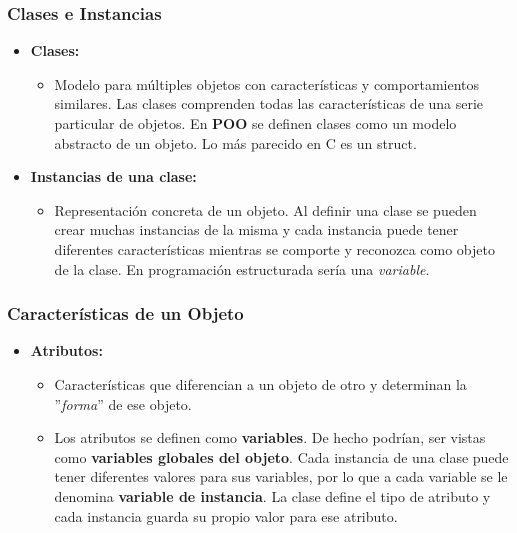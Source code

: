 \documentclass{beamer}
\begin{document}
\begin{frame}
  \frametitle{Clases e Instancias}

  \begin{itemize}
  \item \textbf{Clases:}    
    \begin{itemize}
    \item[] Modelo para múltiples objetos con características y
      comportamientos similares. Las clases comprenden todas las
      características de una serie particular de objetos. En
      \textbf{POO} se definen clases como un modelo abstracto de un
      objeto. Lo más parecido en C es un struct.
    \end{itemize}
    
  \item \textbf{Instancias de una clase:}
    \begin{itemize}
    \item[] Representación concreta de un objeto. Al definir una clase
      se pueden crear muchas instancias de la misma y cada instancia
      puede tener diferentes características mientras se comporte y
      reconozca como objeto de la clase. En programación estructurada
      sería una \emph{variable}.
    \end{itemize}
    
  \end{itemize}
\end{frame}

\begin{frame}
  \frametitle{Características de un Objeto} 

  \begin{itemize}
  \item \textbf{Atributos:}
    \begin{itemize}
    \item[] Características que diferencian a un objeto de otro y
      determinan la ''\emph{forma}'' de ese objeto.
      
    \item[] Los atributos se definen como \textbf{variables}. De hecho
      podrían, ser vistas como \textbf{variables globales del
        objeto}. Cada instancia de una clase puede tener diferentes
      valores para sus variables, por lo que a cada variable se le
      denomina \textbf{variable de instancia}. La clase define el tipo
      de atributo y cada instancia guarda su propio valor para ese
      atributo.
    \end{itemize}
  \end{itemize}
\end{frame}
\end{document}
